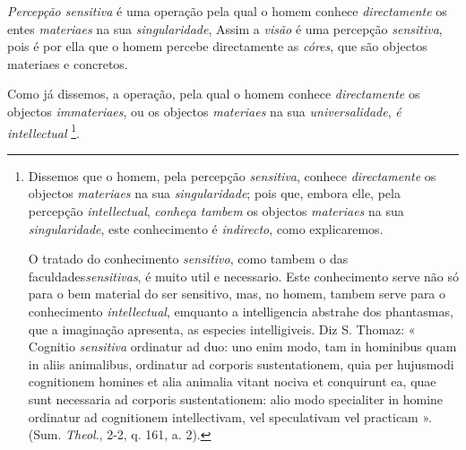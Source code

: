 
\emph{Percepção sensitiva} é uma operação pela qual o homem conhece \emph{directamente} os entes \emph{materiaes} na sua \emph{singularidade}, Assim a \emph{visão} é uma percepção \emph{sensitiva}, pois é por ella que o homem percebe directamente as \emph{córes}, que são objectos materiaes e concretos.

Como já dissemos, a operação, pela qual o homem conhece \emph{directamente} os objectos \emph{immateriaes}, ou os objectos \emph{materiaes} na sua \emph{universalidade}, \emph{é intellectual} \footnote{Dissemos que o homem, pela percepção \emph{sensitiva}, conhece \emph{directamente} os objectos \emph{materiaes} na sua \emph{singularidade}; pois que, embora elle, pela percepção \emph{intellectual}, \emph{conheça tambem} os objectos \emph{materiaes} na sua \emph{singularidade}, este conhecimento é \emph{indirecto}, como explicaremos.\par O tratado do conhecimento \emph{sensitivo}, como tambem o das faculdades\emph{sensitivas}, é muito util e necessario. Este conhecimento serve não só para o bem material do ser sensitivo, mas, no homem, tambem serve para o conhecimento \emph{intellectual}, emquanto a intelligencia abstrahe dos phantasmas, que a imaginação apresenta, as especies intelligiveis. Diz S. Thomaz: « Cognitio \emph{sensitiva} ordinatur ad duo: uno enim modo, tam in hominibus quam in aliis animalibus, ordinatur ad corporis sustentationem, quia per hujusmodi cognitionem homines et alia animalia vitant nociva et conquirunt ea, quae sunt necessaria ad corporis sustentationem: alio modo specialiter in homine ordinatur ad cognitionem intellectivam, vel speculativam vel practicam ». (Sum. \emph{Theol}., 2-2, q. 161, a. 2).}.

